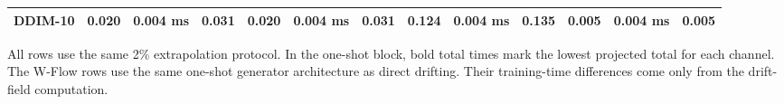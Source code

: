 \begin{table}[t]
{\begin{tabular}{@{}lcccccccccccc@{}}
DDIM-10 & 0.020 & 0.004 ms & 0.031 & 0.020 & 0.004 ms & 0.031 & 0.124 & 0.004 ms & 0.135 & 0.005 & 0.004 ms & 0.005 \\
\bottomrule
\end{tabular}
}
\par\vspace{0.25em}
\begin{minipage}{0.96\textwidth}
\footnotesize\raggedright
All rows use the same 2\% extrapolation protocol. In the one-shot block, bold total times mark the lowest projected total for each channel. The W-Flow rows use the same one-shot generator architecture as direct drifting. Their training-time differences come only from the drift-field computation.
\end{minipage}
\end{table}
